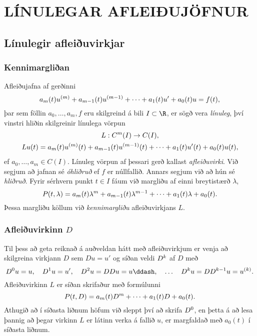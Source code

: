 \chapter
{LÍNULEGAR AFLEIÐUJÖFNUR}
 


\section{Línulegir afleiðuvirkjar}


\subsection*{Kennimargliðan}

Afleiðujafna af gerðinni
 $$a_m(t)u\sp{(m)}+a_{m-1}(t)u\sp{(m-1)}+\cdots+a_1(t)u'+a_0(t)u=f(t),
 $$
þar sem föllin $a_0,\dots,a_m,f$ eru skilgreind á bili $I\subset \R$,
er sögð vera {\it línuleg}, því vinstri
hliðin skilgreinir línulega vörpun
\begin{gather*}
L:C\sp m(I)\to C(I),\\
Lu(t)=
a_m(t)u\sp{(m)}(t)+a_{m-1}(t)u\sp{(m-1)}(t)+
\cdots+a_1(t)u'(t)+a_0(t)u(t),
\end{gather*}
ef $a_0,\dots,a_m\in C(I)$.
Línuleg vörpun af þessari gerð  kallast {\it
afleiðuvirki}.  
Við segjum að jafnan sé {\it
óhliðruð} ef $f$ er núllfallið.
Annars segjum við að hún sé {\it
hliðruð}.
Fyrir sérhvern punkt $t\in I$ fáum við margliðu af einni breytistærð
$\lambda$,
 \begin{equation*}
P(t,\lambda)= a_m(t)\lambda\sp{m}+a_{m-1}(t)\lambda\sp{m-1}+
\cdots+a_1(t)\lambda+a_0(t).\label{2.1.1}
 \end{equation*}
Þessa margliðu köllum við {\it
kennimargliðu
} afleiðuvirkjans $L$.


\subsection*{Afleiðuvirkinn $D$}

Til þess að geta reiknað á auðveldan hátt með afleiðuvirkjum er venja að
skilgreina virkjann $D$ sem $Du=u'$ og síðan veldi $D\sp k$ af $D$ með
$$
D\sp 0u=u, \quad D\sp 1u=u', \quad
D\sp 2u=DDu=u\ddash, \quad \dots \quad D\sp ku= D D\sp
{k-1}u=u\sp{(k)}. 
$$
Afleiðuvirkinn $L$ er síðan  skrifaður með formúlunni
 \begin{equation*}P(t,D)=a_m(t)D\sp m+\cdots+a_1(t)D+a_0(t).\label{2.1.2}
 \end{equation*}
Athugið að í síðasta liðnum höfum við sleppt því að skrifa $D\sp 0$,
en þetta á að lesa þannig að þegar virkinn $L$ er látinn verka á fallið $u$,
er margfaldað með $a_0(t)$ í síðasta liðnum.  

